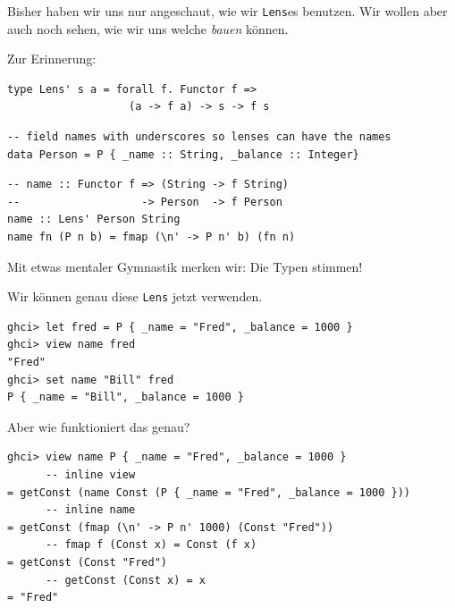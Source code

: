 \documentclass{beamer}
\begin{document}

\begin{frame}[fragile]

Bisher haben wir uns nur angeschaut, wie wir \texttt{Lens}es benutzen. Wir wollen aber auch noch sehen, wie wir uns welche \emph{bauen} können.
\smallskip
\smallskip

Zur Erinnerung:
\begin{verbatim}
type Lens' s a = forall f. Functor f =>
                   (a -> f a) -> s -> f s
\end{verbatim}
\smallskip

\begin{verbatim}
-- field names with underscores so lenses can have the names
data Person = P { _name :: String, _balance :: Integer}
\end{verbatim}
\bigskip

\begin{verbatim}
-- name :: Functor f => (String -> f String)
--                   -> Person  -> f Person
name :: Lens' Person String
name fn (P n b) = fmap (\n' -> P n' b) (fn n)
\end{verbatim}
\pause

Mit etwas mentaler Gymnastik merken wir: Die Typen stimmen!

\end{frame}


\begin{frame}[fragile]

Wir können genau diese \texttt{Lens} jetzt verwenden.
\pause

\begin{verbatim}
ghci> let fred = P { _name = "Fred", _balance = 1000 }
ghci> view name fred
"Fred"
ghci> set name "Bill" fred
P { _name = "Bill", _balance = 1000 }
\end{verbatim}
\pause

Aber wie funktioniert das genau?\pause

\begin{verbatim}
ghci> view name P { _name = "Fred", _balance = 1000 }
      -- inline view
= getConst (name Const (P { _name = "Fred", _balance = 1000 }))
      -- inline name
= getConst (fmap (\n' -> P n' 1000) (Const "Fred"))
      -- fmap f (Const x) = Const (f x)
= getConst (Const "Fred")
      -- getConst (Const x) = x
= "Fred"
\end{verbatim}

\end{frame}
\end{document}
